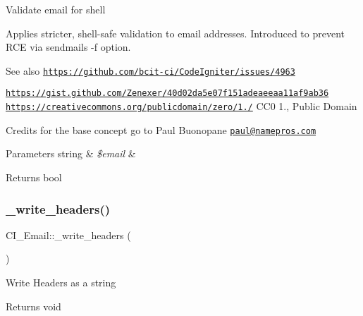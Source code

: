 Validate email for shell

Applies stricter, shell-\/safe validation to email addresses. Introduced to prevent R\+CE via sendmail\textquotesingle{}s -\/f option.

\begin{DoxySeeAlso}{See also}
\href{https://github.com/bcit-ci/CodeIgniter/issues/4963}{\tt https\+://github.\+com/bcit-\/ci/\+Code\+Igniter/issues/4963} 

\href{https://gist.github.com/Zenexer/40d02da5e07f151adeaeeaa11af9ab36}{\tt https\+://gist.\+github.\+com/\+Zenexer/40d02da5e07f151adeaeeaa11af9ab36}  \href{https://creativecommons.org/publicdomain/zero/1.0/}{\tt https\+://creativecommons.\+org/publicdomain/zero/1./} C\+C0 1., Public Domain
\end{DoxySeeAlso}
Credits for the base concept go to Paul Buonopane \href{mailto:paul@namepros.com}{\tt paul@namepros.\+com}


\begin{DoxyParams}[1]{Parameters}
string & {\em \$email} & \\
\hline
\end{DoxyParams}
\begin{DoxyReturn}{Returns}
bool 
\end{DoxyReturn}
\mbox{\label{class_c_i___email_a5db89d2d846095177141a8ed6df3ae33}} 
\subsubsection{\texorpdfstring{\+\_\+write\+\_\+headers()}{\_write\_headers()}}
{\footnotesize\ttfamily C\+I\+\_\+\+Email\+::\+\_\+write\+\_\+headers (\begin{DoxyParamCaption}{ }\end{DoxyParamCaption})\hspace{0.3cm}{\ttfamily [protected]}}

Write Headers as a string

\begin{DoxyReturn}{Returns}
void 
\end{DoxyReturn}
\mbox{\label{class_c_i___email_a61f319b2e81ea8764642263f7427ffbf}} 
